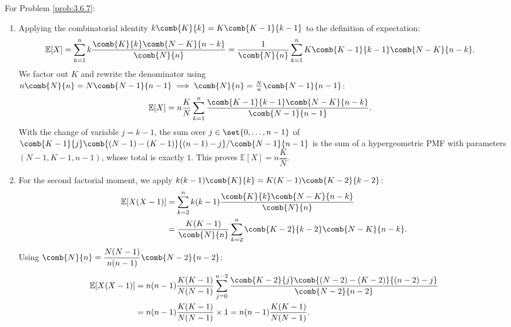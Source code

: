 \begin{solucion}
	\label{sol:3.6.7}
	For Problem \ref{prob:3.6.7}:
	\begin{enumerate}
		\item Applying the combinatorial identity $k \comb{K}{k} = K \comb{K-1}{k-1}$ to the definition of expectation:
		\begin{align*}
			\mathbb{E}[X] &= \sum_{k=1}^n k \dfrac{\comb{K}{k}\comb{N-K}{n-k}}{\comb{N}{n}} = \dfrac{1}{\comb{N}{n}} \sum_{k=1}^n K \comb{K-1}{k-1}\comb{N-K}{n-k}.
		\end{align*}
		We factor out $K$ and rewrite the denominator using $n \comb{N}{n} = N \comb{N-1}{n-1} \implies \comb{N}{n} = \frac{N}{n} \comb{N-1}{n-1}$:
		\begin{align*}
			\mathbb{E}[X] &= n \dfrac{K}{N} \sum_{k=1}^n \dfrac{\comb{K-1}{k-1}\comb{N-K}{n-k}}{\comb{N-1}{n-1}}.
		\end{align*}
		With the change of variable $j = k-1$, the sum over $j \in \set{0, \dots, n-1}$ of $\comb{K-1}{j}\comb{(N-1)-(K-1)}{(n-1)-j}/\comb{N-1}{n-1}$ is the sum of a hypergeometric PMF with parameters $(N-1, K-1, n-1)$, whose total is exactly $1$. This proves $\mathbb{E}[X] = n \dfrac{K}{N}$.
		\item For the second factorial moment, we apply $k(k-1)\comb{K}{k} = K(K-1)\comb{K-2}{k-2}$:
		\begin{align*}
			\mathbb{E}[X(X-1)] &= \sum_{k=2}^n k(k-1) \dfrac{\comb{K}{k}\comb{N-K}{n-k}}{\comb{N}{n}} \\
			&= \dfrac{K(K-1)}{\comb{N}{n}} \sum_{k=2}^n \comb{K-2}{k-2}\comb{N-K}{n-k}.
		\end{align*}
		Using $\comb{N}{n} = \dfrac{N(N-1)}{n(n-1)}\comb{N-2}{n-2}$:
		\begin{align*}
			\mathbb{E}[X(X-1)] &= n(n-1)\dfrac{K(K-1)}{N(N-1)} \sum_{j=0}^{n-2} \dfrac{\comb{K-2}{j}\comb{(N-2)-(K-2)}{(n-2)-j}}{\comb{N-2}{n-2}} \\
			&= n(n-1)\dfrac{K(K-1)}{N(N-1)} \times 1 = n(n-1)\dfrac{K(K-1)}{N(N-1)}.
		\end{align*}
	\end{enumerate}
\end{solucion}

